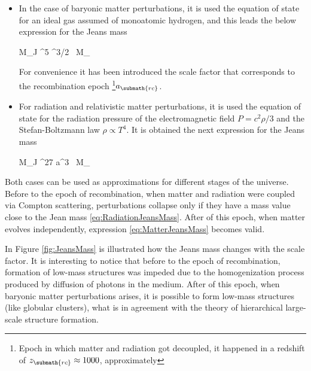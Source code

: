 \begin{itemize}
\item In the case of baryonic matter perturbations, it is used the 
equation of state for an ideal gas assumed of monoatomic hydrogen, and
this leads the below expression for the Jeans mass



{ M_{J} ^5
^{3/2} \mbox{ M}_{\odot}}


For convenience it has been introduced the scale factor that corresponds
to the recombination epoch \footnote{Epoch in which matter and radiation 
got decoupled, it happened in a redshift of $z_{\submath{rc}}\approx 1000$,
approximately}$a_{\submath{rc}}$.


\item For radiation and relativistic matter perturbations, it is used the 
equation of state for the radiation pressure of the electromagnetic field
\cite{jackson1999} $P = c^2\rho/3$ and the Stefan-Boltzmann law $\rho 
\propto T^4$. It is obtained the next expression for the Jeans mass



{ M_{J}   ^{27} a^3 \mbox{ M}_{\odot}}
\end{itemize}

	
Both cases can be used as approximations for different stages of the 
universe. Before to the epoch of recombination, when matter and radiation
were coupled via Compton scattering, perturbations collapse only if they 
have a mass value close to the Jean mass \ref{eq:RadiationJeansMass}. After
of this epoch, when matter evolves independently, expression 
\ref{eq:MatterJeansMass} becomes valid.


In Figure \ref{fig:JeansMass} is illustrated how the Jeans mass changes
with the scale factor. It is interesting to notice that before to the 
epoch of recombination, formation of low-mass structures was impeded due to
the homogenization process produced by diffusion of photons in the medium.
After of this epoch, when baryonic matter perturbations arises, it is 
possible to form low-mass structures (like globular clusters), what is
in agreement with the theory of hierarchical large-scale structure 
formation.


